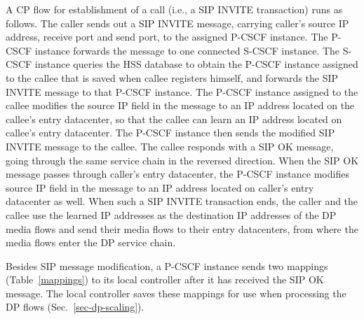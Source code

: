 A CP flow for establishment of a call (i.e., a SIP INVITE transaction) runs as follows.
The caller sends out a SIP INVITE message, carrying caller's source IP address, receive port and send port, to the assigned P-CSCF instance.
The P-CSCF instance forwards the message to one connected S-CSCF instance.  The
S-CSCF instance queries the HSS database to obtain the P-CSCF instance assigned
to the callee that is saved when callee registers himself, and forwards the SIP
INVITE message to that P-CSCF instance. The P-CSCF instance assigned to the
callee modifies the source IP field in the message to an IP address located on
the callee's entry datacenter, so that the callee can learn an IP address
located on callee's entry datacenter. The P-CSCF instance then sends the
modified SIP INVITE message to the callee.  The callee responds with a SIP OK
message, going through the same service chain in the reversed direction. When
the SIP OK message passes through caller's entry datacenter, the P-CSCF instance
modifies source IP field in the message to an IP address located on caller's
entry datacenter as well. When such a SIP INVITE transaction ends, the
caller and the callee use the learned IP addresses as the destination IP addresses of the DP media flows and send their media flows to their entry datacenters, from where the media flows enter the DP service chain.



Besides SIP message modification, a P-CSCF instance sends two mappings (Table~\ref{mappings}) to its local controller after it has received the SIP OK message. The local controller saves these mappings for use when processing the DP flows (Sec.~\ref{sec-dp-scaling}). %



